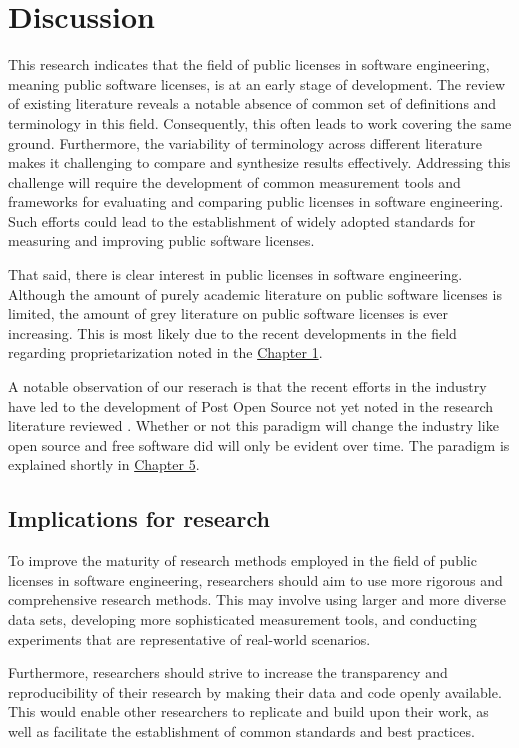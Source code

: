 \chapter{Discussion\label{discussion}}
This research indicates that the field of public licenses in software engineering, meaning public software licenses, is at an early stage of development. The review of existing literature reveals a notable absence of common set of definitions and terminology in this field. Consequently, this often leads to work covering the same ground. Furthermore, the variability of terminology across different literature makes it challenging to compare and synthesize results effectively. Addressing this challenge will require the development of common measurement tools and frameworks for evaluating and comparing public licenses in software engineering. Such efforts could lead to the establishment of widely adopted standards for measuring and improving public software licenses.

That said, there is clear interest in public licenses in software engineering. Although the amount of purely academic literature on public software licenses is limited, the amount of grey literature on public software licenses is ever increasing. This is most likely due to the recent developments in the field regarding proprietarization noted in the \hyperref[intro]{Chapter 1}. 

A notable observation of our reserach is that the recent efforts in the industry have led to the development of Post Open Source not yet noted in the research literature reviewed \citep{register:poss}. Whether or not this paradigm will change the industry like open source and free software did will only be evident over time. The paradigm is explained shortly in \hyperref[conclusions]{Chapter 5}.

\section{Implications for research}
To improve the maturity of research methods employed in the field of public licenses in software engineering, researchers should aim to use more rigorous and comprehensive research methods. This may involve using larger and more diverse data sets, developing more sophisticated measurement tools, and conducting experiments that are representative of real-world scenarios.

Furthermore, researchers should strive to increase the transparency and reproducibility of their research by making their data and code openly available. This would enable other researchers to replicate and build upon their work, as well as facilitate the establishment of common standards and best practices.

